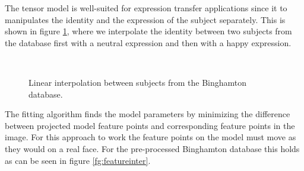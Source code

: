 \documentclass[11pt,a4paper]{report}
\begin{document}
The tensor model is well-suited for expression transfer applications since it to
manipulates the identity and the expression of the subject separately. This
is shown in figure \ref{fg:faceidinter}, where we interpolate the identity
between two subjects from the database first with a neutral expression
and then with a happy expression.

\begin{figure}[H]
\centering
{}\\

\caption{Linear interpolation between subjects from the Binghamton database.}\label{fg:faceidinter}
\end{figure}

The fitting algorithm finds the model parameters by minimizing the difference
between projected model feature points and corresponding feature points in the
image. For this approach to work the feature points on the model must move as
they would on a real face. For the pre-processed Binghamton database this holds as can be
seen in figure \ref{fg:featureinter}.
\end{document}
